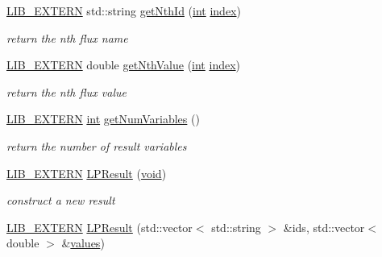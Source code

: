 \begin{DoxyCompactItemize}
\item 
\hyperlink{libutil_8h_a48cc004c21e097c0d7c1c5fa8dc03b96}{L\+I\+B\+\_\+\+E\+X\+T\+E\+RN} std\+::string \hyperlink{class_l_i_b___s_t_r_u_c_t_u_r_a_l_1_1_l_p_result_ab060ab0e8e377fdd03994836b55693ab}{get\+Nth\+Id} (\hyperlink{lp__lib_8h_adeb9ec6400320e4923ac9d836d509ddb}{int} \hyperlink{lp__lib_8h_a1499949ec4dbbc5290ece2ac210bba35}{index})
\begin{DoxyCompactList}\small\item\em return the nth flux name \end{DoxyCompactList}\item 
\hyperlink{libutil_8h_a48cc004c21e097c0d7c1c5fa8dc03b96}{L\+I\+B\+\_\+\+E\+X\+T\+E\+RN} double \hyperlink{class_l_i_b___s_t_r_u_c_t_u_r_a_l_1_1_l_p_result_a6b2d91cd309738fc566ca47b782ab902}{get\+Nth\+Value} (\hyperlink{lp__lib_8h_adeb9ec6400320e4923ac9d836d509ddb}{int} \hyperlink{lp__lib_8h_a1499949ec4dbbc5290ece2ac210bba35}{index})
\begin{DoxyCompactList}\small\item\em return the nth flux value \end{DoxyCompactList}\item 
\hyperlink{libutil_8h_a48cc004c21e097c0d7c1c5fa8dc03b96}{L\+I\+B\+\_\+\+E\+X\+T\+E\+RN} \hyperlink{lp__lib_8h_adeb9ec6400320e4923ac9d836d509ddb}{int} \hyperlink{class_l_i_b___s_t_r_u_c_t_u_r_a_l_1_1_l_p_result_a0547e8a476bc55cc4bd2affebd140f16}{get\+Num\+Variables} ()
\begin{DoxyCompactList}\small\item\em return the number of result variables \end{DoxyCompactList}\item 
\hyperlink{libutil_8h_a48cc004c21e097c0d7c1c5fa8dc03b96}{L\+I\+B\+\_\+\+E\+X\+T\+E\+RN} \hyperlink{class_l_i_b___s_t_r_u_c_t_u_r_a_l_1_1_l_p_result_a7203330664051aef76d594cbb03e2afd}{L\+P\+Result} (\hyperlink{lp__lib_8h_ac7828c7b2b31d2e11af17bdb6289c5d9}{void})
\begin{DoxyCompactList}\small\item\em construct a new result \end{DoxyCompactList}\item 
\hyperlink{libutil_8h_a48cc004c21e097c0d7c1c5fa8dc03b96}{L\+I\+B\+\_\+\+E\+X\+T\+E\+RN} \hyperlink{class_l_i_b___s_t_r_u_c_t_u_r_a_l_1_1_l_p_result_acb7cc448e46c7bf8138ed4135fa27efb}{L\+P\+Result} (std\+::vector$<$ std\+::string $>$ \&ids, std\+::vector$<$ double $>$ \&\hyperlink{lp__lib_8h_a7b72c61d6eb1542d2d9550bbdf37c344}{values})

\end{DoxyCompactItemize}
